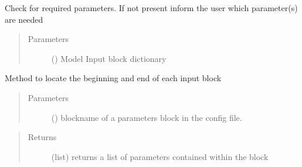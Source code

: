 \documentclass[letterpaper,10pt,english]{sphinxmanual}
\begin{document}
\begin{fulllineitems}
\begin{fulllineitems}
\end{fulllineitems}


\begin{fulllineitems}
\label{\detokenize{index:lb_colloids.LB.LBIO.Config.check_model_parameters}}
Check for required parameters. If not present inform the user which parameter(s) are needed
\begin{quote}\begin{description}
\item[{Parameters}] \leavevmode
{} () \textendash{} Model Input block dictionary

\end{description}\end{quote}

\end{fulllineitems}


\begin{fulllineitems}
\label{\detokenize{index:lb_colloids.LB.LBIO.Config.get_block}}
Method to locate the beginning and end of each input block
\begin{quote}\begin{description}
\item[{Parameters}] \leavevmode
{} () \textendash{} blockname of a parameters block in the config file.

\end{description}\end{quote}
\begin{quote}\begin{description}
\item[{Returns}] \leavevmode
(list) returns a list of parameters contained within the block

\end{description}\end{quote}

\end{fulllineitems}



\end{fulllineitems}
\end{document}
